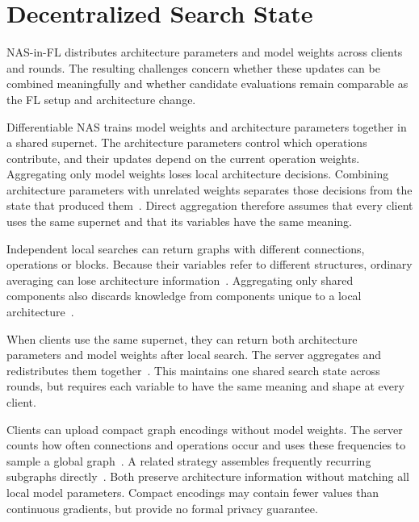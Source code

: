 \section{Decentralized Search State}

NAS-in-FL distributes architecture parameters and model weights across clients and rounds. The resulting challenges concern whether these updates can be combined meaningfully and whether candidate evaluations remain comparable as the FL setup and architecture change.


Differentiable NAS trains model weights and architecture parameters together in a shared supernet. The architecture parameters control which operations contribute, and their updates depend on the current operation weights. Aggregating only model weights loses local architecture decisions. Combining architecture parameters with unrelated weights separates those decisions from the state that produced them~\cite{fednas_2021,dfnas_2020,feathers_2023}. Direct aggregation therefore assumes that every client uses the same supernet and that its variables have the same meaning.

Independent local searches can return graphs with different connections, operations or blocks. Because their variables refer to different structures, ordinary averaging can lose architecture information~\cite{multi-granular_fednas_2023,efnas_2024}. Aggregating only shared components also discards knowledge from components unique to a local architecture~\cite{f2nas_2024}.

 When clients use the same supernet, they can return both architecture parameters and model weights after local search. The server aggregates and redistributes them together~\cite{fednas_2021,dfnas_2020,feathers_2023}. This maintains one shared search state across rounds, but requires each variable to have the same meaning and shape at every client.

 Clients can upload compact graph encodings without model weights. The server counts how often connections and operations occur and uses these frequencies to sample a global graph~\cite{multi-granular_fednas_2023}. A related strategy assembles frequently recurring subgraphs directly~\cite{efnas_2024}. Both preserve architecture information without matching all local model parameters. Compact encodings may contain fewer values than continuous gradients, but provide no formal privacy guarantee.

